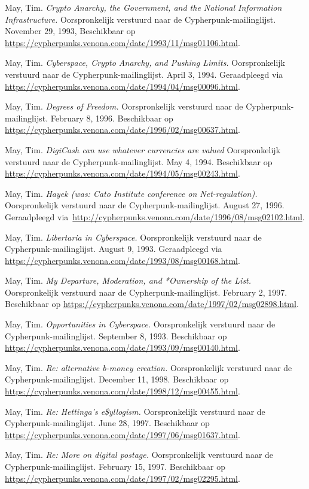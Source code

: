 \documentclass[
  a5paper,
  smalldemyvopaper,11pt,twoside,onecolumn,openright,extrafontsizes,
hidelinks]{memoir}
\begin{document}
{May, Tim. \emph{Crypto Anarchy, the Government, and the National
Information Infrastructure.} Oorspronkelijk verstuurd naar de
Cypherpunk-mailinglijst. November 29, 1993, Beschikbaar op
\url{https://cypherpunks.venona.com/date/1993/11/msg01106.html}.

May, Tim. \emph{Cyberspace, Crypto Anarchy, and Pushing Limits.}
Oorspronkelijk verstuurd naar de Cypherpunk-mailinglijst. April 3, 1994.
Geraadpleegd via
\url{https://cypherpunks.venona.com/date/1994/04/msg00096.html}.

May, Tim. \emph{Degrees of Freedom.} Oorspronkelijk verstuurd naar de
Cypherpunk-mailinglijst. February 8, 1996. Beschikbaar op
\url{https://cypherpunks.venona.com/date/1996/02/msg00637.html}.

May, Tim. \emph{DigiCash can use whatever currencies are valued}
Oorspronkelijk verstuurd naar de Cypherpunk-mailinglijst. May 4, 1994.
Beschikbaar op
\url{https://cypherpunks.venona.com/date/1994/05/msg00243.html}.

May, Tim. \emph{Hayek (was: Cato Institute conference on
Net-regulation).} Oorspronkelijk verstuurd naar de
Cypherpunk-mailinglijst. August 27, 1996. Geraadpleegd
via~\url{http://cypherpunks.venona.com/date/1996/08/msg02102.html}.

May, Tim. \emph{Libertaria in Cyberspace.} Oorspronkelijk verstuurd naar
de Cypherpunk-mailinglijst. August 9, 1993. Geraadpleegd via
\url{https://cypherpunks.venona.com/date/1993/08/msg00168.html}.

May, Tim. \emph{My Departure, Moderation, and *Ownership of the List.}
Oorspronkelijk verstuurd naar de Cypherpunk-mailinglijst. February 2,
1997. Beschikbaar op
\url{https://cypherpunks.venona.com/date/1997/02/msg02898.html}.

May, Tim. \emph{Opportunities in Cyberspace.} Oorspronkelijk verstuurd
naar de Cypherpunk-mailinglijst. September 8, 1993. Beschikbaar op
\url{https://cypherpunks.venona.com/date/1993/09/msg00140.html}.

May, Tim. \emph{Re: alternative b-money creation.} Oorspronkelijk
verstuurd naar de Cypherpunk-mailinglijst. December 11, 1998.
Beschikbaar op
\url{https://cypherpunks.venona.com/date/1998/12/msg00455.html}.

May, Tim. \emph{Re: Hettinga's e\$yllogism.} Oorspronkelijk verstuurd
naar de Cypherpunk-mailinglijst. June 28, 1997. Beschikbaar op
\url{https://cypherpunks.venona.com/date/1997/06/msg01637.html}.

May, Tim. \emph{Re: More on digital postage.} Oorspronkelijk verstuurd
naar de Cypherpunk-mailinglijst. February 15, 1997. Beschikbaar op
\url{https://cypherpunks.venona.com/date/1997/02/msg02295.html}.

}
\end{document}
